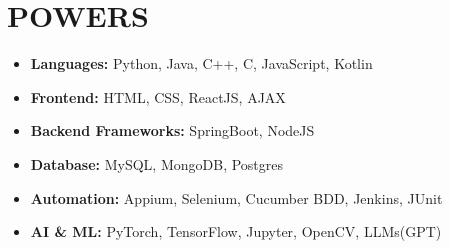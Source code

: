 \documentclass[letterpaper,11pt]{article}
\newcommand{\resumeItem}[1]{
  \item\small{
    {#1 \vspace{-2pt}}
  }
}
\newcommand{\resumeSubHeadingListStart}{\begin{itemize}[leftmargin=0.15in, label={}]}
\newcommand{\resumeSubHeadingListEnd}{\end{itemize}}
\begin{document}
\section{\textbf{POWERS}}

\resumeSubHeadingListStart
\resumeItem{\textbf{Languages:} Python, Java, C++, C, JavaScript, Kotlin}
\vspace{-7pt}
\resumeItem{\textbf{Frontend:} HTML, CSS, ReactJS, AJAX}
\vspace{-7pt}
\resumeItem{\textbf{Backend Frameworks:} SpringBoot, NodeJS}

\vspace{-7pt}
\resumeItem{\textbf{Database:} MySQL, MongoDB, Postgres}
\vspace{-7pt}
\resumeItem{\textbf{Automation:} Appium, Selenium, Cucumber BDD, Jenkins, JUnit}
\vspace{-7pt}

\resumeItem{\textbf{AI \& ML:} PyTorch, TensorFlow, Jupyter, OpenCV, LLMs(GPT) }
\vspace{-7pt}


\resumeSubHeadingListEnd

\vspace{-10pt}
\end{document}
